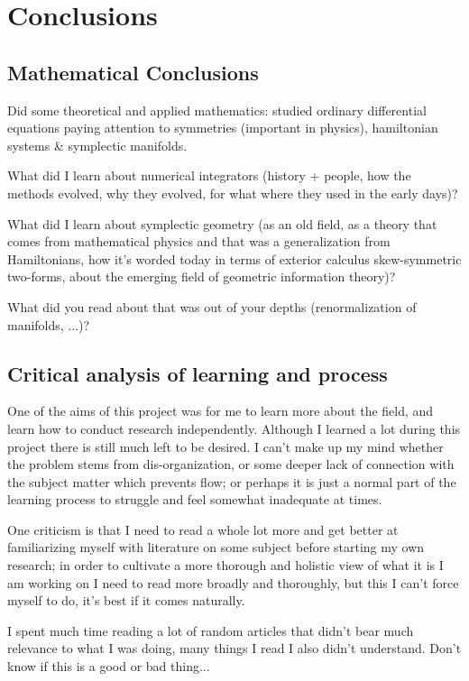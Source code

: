 \documentclass[12pt]{article}
\begin{document}
\section{Conclusions}
\subsection{Mathematical Conclusions}
Did some theoretical and applied mathematics: studied ordinary differential equations paying attention to symmetries (important in physics), hamiltonian systems \& symplectic manifolds. 

What did I learn about numerical integrators (history + people, how the methods evolved, why they evolved, for what where they used in the early days)?

What did I learn about symplectic geometry (as an old field, as a theory that comes from mathematical physics and that was a generalization from Hamiltonians, how it's worded today in terms of exterior calculus skew-symmetric two-forms, about the emerging field of geometric information theory)?

What did you read about that was out of your depths (renormalization of manifolds, ...)?

\subsection{Critical analysis of learning and process}
One of the aims of this project was for me to learn more about the field, and learn how to conduct research independently. Although I learned a lot during this project there is still much left to be desired. I can't make up my mind whether the problem stems from dis-organization, or some deeper lack of connection with the subject matter which prevents flow; or perhaps it is just a normal part of the learning process to struggle and feel somewhat inadequate at times.

One criticism is that I need to read a whole lot more and get better at familiarizing myself with literature on some subject before starting my own research; in order to cultivate a more thorough and holistic view of what it is I am working on I need to read more broadly and thoroughly, but this I can't force myself to do, it's best if it comes naturally. 

I spent much time reading a lot of random articles that didn't bear much relevance to what I was doing, many things I read I also didn't understand. Don't know if this is a good or bad thing... 
\end{document}
